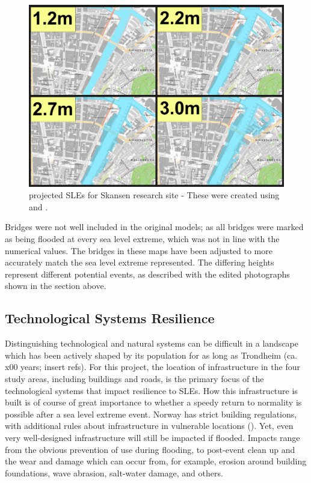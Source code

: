 \begin{figure}[H]
    \centering
    \includegraphics[width=16cm]{fig_sle/nidelva-sle-num.png}
    \caption{projected SLEs for Skansen research site - These were created using \cite{kartverket_se_2021} and \cite{stormflo_database_stormflo_2021}. }
    \label{fig:sle_nidelva_num}
\end{figure}

 Bridges were not well included in the original models; as all bridges were marked as being flooded at every sea level extreme, which was not in line with the numerical values. The bridges in these maps have been adjusted to more accurately match the sea level extreme represented. The differing heights represent different potential events,  as described with the edited photographs shown in the section above. 

\subsection{Technological Systems Resilience}
Distinguishing technological and natural systems can be difficult in a landscape which has been actively shaped by its population for as long as Trondheim (ca. x00 years; insert refs). For this project, the location of infrastructure in the four study areas, including buildings and roads, is the primary focus of the technological systems that impact resilience to SLEs. How this infrastructure is built is of course of great importance to whether a speedy return to normality is possible after a sea level extreme event. Norway has strict building regulations, with additional rules about infrastructure in vulnerable locations (\cite{direktoratet_for_byggkvalitet_direktoratet_nodate}). Yet, even very well-designed infrastructure will still be impacted if flooded. Impacts range from the obvious prevention of use during flooding, to post-event clean up and the wear and damage which can occur from, for example,  erosion around building foundations, wave abrasion, salt-water damage, and others.
